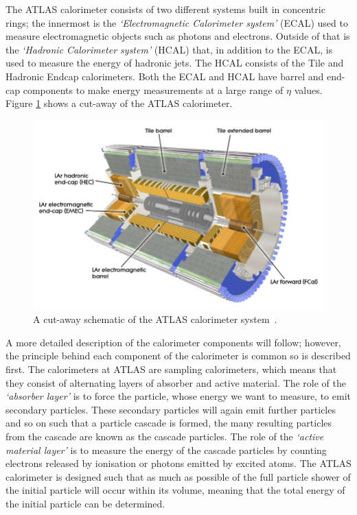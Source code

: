 The ATLAS calorimeter consists of two different systems built in concentric rings;
the innermost is the \textit{`Electromagnetic Calorimeter system'} (ECAL) used to measure electromagnetic objects such as photons and electrons.
Outside of that is the \textit{`Hadronic Calorimeter system'} (HCAL) that, in addition to the ECAL, is used to measure the energy of hadronic jets.
The HCAL consists of the Tile and Hadronic Endcap calorimeters.
Both the ECAL and HCAL have barrel and end-cap components to make energy measurements at a large range of $\eta$ values.
Figure \ref{fig:det-calo_schem} shows a cut-away of the ATLAS calorimeter.

\begin{figure}[!ht]
  \begin{center}
    \includegraphics[width=1\linewidth, angle=0]{figs/Detector/Calo_schem.png}
  \end{center}
  \caption[A cut-away schematic of the ATLAS calorimeter system.]
          {A cut-away schematic of the ATLAS calorimeter system~\cite{det-ATLAS_Exp}.}
  \label{fig:det-calo_schem}
\end{figure}

A more detailed description of the calorimeter components will follow;
however, the principle behind each component of the calorimeter is common so is described first.
The calorimeters at ATLAS are sampling calorimeters, which means that they consist of alternating layers of absorber and active material.
The role of the \textit{`absorber layer'} is to force the particle, whose energy we want to measure, to emit secondary particles.
These secondary particles will again emit further particles and so on such that a particle cascade is formed,
the many resulting particles from the cascade are known as the cascade particles.
The role of the \textit{`active material layer'} is to measure the energy of the cascade particles %
by counting electrons released by ionisation or photons emitted by excited atoms.
The ATLAS calorimeter is designed such that as much as possible of the full particle shower of the initial particle will occur within its volume,
meaning that the total energy of the initial particle can be determined.

